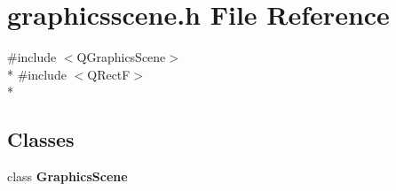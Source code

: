 \section{graphicsscene.\+h File Reference}
\label{bk3_2graphicsscene_8h}
{\ttfamily \#include $<$Q\+Graphics\+Scene$>$}\\*
{\ttfamily \#include $<$Q\+RectF$>$}\\*
\subsection*{Classes}
\begin{DoxyCompactItemize}
\item 
class {\bf Graphics\+Scene}
\end{DoxyCompactItemize}
